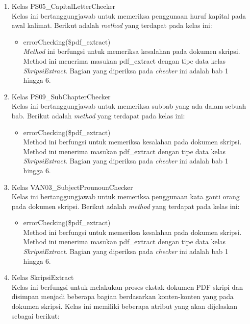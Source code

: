 \begin{enumerate}
	\item Kelas PS05\_CapitalLetterChecker \\
	Kelas ini bertanggungjawab untuk memeriksa penggunaan huruf kapital pada awal kalimat. Berikut adalah \textit{method} yang terdapat pada kelas ini:
		
		\begin{itemize}
			\item errorChecking(\$pdf\_extract) \\
			\textit{Method} ini berfungsi untuk memeriksa kesalahan pada dokumen skripsi. Method ini menerima masukan pdf\_extract dengan tipe data kelas \textit{SkripsiExtract}. Bagian yang diperiksa pada \textit{checker} ini adalah bab 1 hingga 6.
		\end{itemize}
			
	\item Kelas PS09\_SubChapterChecker \\
	Kelas ini bertanggungjawab untuk memeriksa subbab yang ada dalam sebuah bab. Berikut adalah \textit{method} yang terdapat pada kelas ini:
			
		\begin{itemize}
			\item errorChecking(\$pdf\_extract) \\
			Method ini berfungsi untuk memeriksa kesalahan pada dokumen skripsi. Method ini menerima masukan pdf\_extract dengan tipe data kelas \textit{SkripsiExtract}. Bagian yang diperiksa pada \textit{checker} ini adalah bab 1 hingga 6.
		\end{itemize}
			
	\item Kelas VAN03\_SubjectProunounChecker \\
	Kelas ini bertanggungjawab untuk memeriksa penggunaan kata ganti orang pada dokumen skripsi. Berikut adalah \textit{method} yang terdapat pada kelas ini:
	
		\begin{itemize}
			\item errorChecking(\$pdf\_extract) \\
			Method ini berfungsi untuk memeriksa kesalahan pada dokumen skripsi. Method ini menerima masukan pdf\_extract dengan tipe data kelas \textit{SkripsiExtract}. Bagian yang diperiksa pada \textit{checker} ini adalah bab 1 hingga 6.
		\end{itemize}
			
	\item Kelas SkripsiExtract \\
	Kelas ini berfungsi untuk melakukan proses ekstak dokumen PDF skripi dan disimpan menjadi beberapa bagian berdasarkan konten-konten yang pada dokumen skripsi. Kelas ini memiliki beberapa atribut yang akan dijelaskan sebagai berikut:
	

\end{enumerate}
